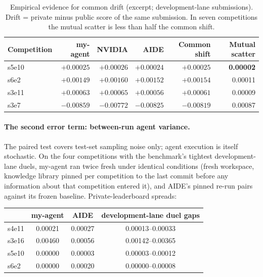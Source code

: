 \documentclass[11pt,a4paper]{article}
\begin{document}
\begin{table}[htbp]
\centering\small
\caption{Empirical evidence for common drift (excerpt; development-lane submissions). Drift = private minus public score of the same submission. In seven competitions the mutual scatter is less than half the common shift.}
\label{tab:drift}
\begin{tabular}{@{}lrrrrr@{}}
\toprule
\textbf{Competition} & \textbf{my-agent} & \textbf{NVIDIA} & \textbf{AIDE} & \textbf{Common shift} & \textbf{Mutual scatter} \\
\midrule
s5e10 & $+0.00025$ & $+0.00026$ & $+0.00024$ & $+0.00025$ & \textbf{0.00002} \\
s6e2  & $+0.00149$ & $+0.00160$ & $+0.00152$ & $+0.00154$ & 0.00011 \\
s3e11 & $+0.00063$ & $+0.00065$ & $+0.00056$ & $+0.00061$ & 0.00009 \\
s3e7  & $-0.00859$ & $-0.00772$ & $-0.00825$ & $-0.00819$ & 0.00087 \\
\bottomrule
\end{tabular}
\end{table}

\paragraph{The second error term: between-run agent variance.} The paired test covers test-set
sampling noise only; agent execution is itself stochastic. On the four competitions with the
benchmark's tightest development-lane duels, my-agent ran twice fresh under identical
conditions (fresh workspace, knowledge library pinned per competition to the last commit before
any information about that competition entered it), and AIDE's pinned re-run pairs against its
frozen baseline. Private-leaderboard spreads:

\begin{center}\small
\begin{tabular}{@{}lccc@{}}
\toprule
 & \textbf{my-agent} & \textbf{AIDE} & \textbf{development-lane duel gaps} \\
\midrule
s4e11 & 0.00021 & 0.00027 & 0.00013--0.00033 \\
s3e16 & 0.00460 & 0.00056 & 0.00142--0.00365 \\
s5e10 & 0.00000 & 0.00003 & 0.00003--0.00012 \\
s6e2  & 0.00000 & 0.00020 & 0.00000--0.00008 \\
\bottomrule
\end{tabular}
\end{center}
\end{document}
